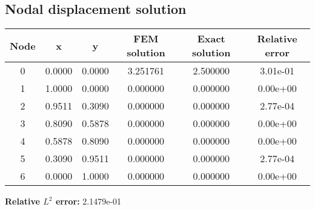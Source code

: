 \subsection{Nodal displacement solution}
\begin{tabular}{|c|c|c|c|c|c|}
\hline
Node & x & y & FEM solution & Exact solution & Relative error \\
\hline
0 & 0.0000 & 0.0000 & 3.251761 & 2.500000 & 3.01e-01 \\
1 & 1.0000 & 0.0000 & 0.000000 & 0.000000 & 0.00e+00 \\
2 & 0.9511 & 0.3090 & 0.000000 & 0.000000 & 2.77e-04 \\
3 & 0.8090 & 0.5878 & 0.000000 & 0.000000 & 0.00e+00 \\
4 & 0.5878 & 0.8090 & 0.000000 & 0.000000 & 0.00e+00 \\
5 & 0.3090 & 0.9511 & 0.000000 & 0.000000 & 2.77e-04 \\
6 & 0.0000 & 1.0000 & 0.000000 & 0.000000 & 0.00e+00 \\
\hline
\end{tabular}
\textbf{Relative $L^2$ error:} 2.1479e-01